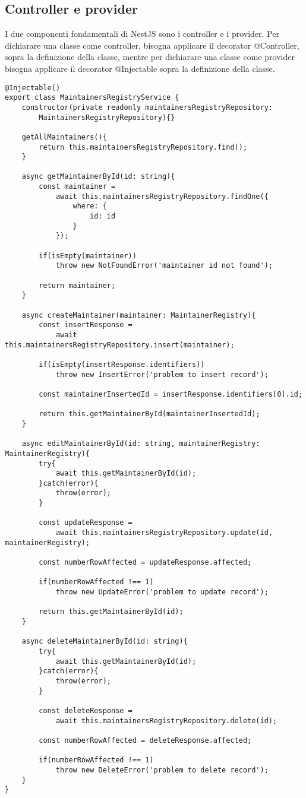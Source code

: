 \subsection{Controller e provider}
I due componenti fondamentali di NestJS sono i controller e i provider. 
Per dichiarare una classe come controller, bisogna applicare il decorator @Controller, sopra la 
definizione della classe, mentre per dichiarare una classe come provider bisogna applicare il decorator
@Injectable sopra la definizione della classe.
\\
\begin{lstlisting}
@Injectable()
export class MaintainersRegistryService {
    constructor(private readonly maintainersRegistryRepository: 
        MaintainersRegistryRepository){}

    getAllMaintainers(){
        return this.maintainersRegistryRepository.find();
    }

    async getMaintainerById(id: string){
        const maintainer = 
            await this.maintainersRegistryRepository.findOne({
                where: {
                    id: id
                }
            });

        if(isEmpty(maintainer))
            throw new NotFoundError('maintainer id not found');

        return maintainer;
    }

    async createMaintainer(maintainer: MaintainerRegistry){
        const insertResponse = 
            await this.maintainersRegistryRepository.insert(maintainer);

        if(isEmpty(insertResponse.identifiers))
            throw new InsertError('problem to insert record');

        const maintainerInsertedId = insertResponse.identifiers[0].id;

        return this.getMaintainerById(maintainerInsertedId);
    }

    async editMaintainerById(id: string, maintainerRegistry: MaintainerRegistry){
        try{
            await this.getMaintainerById(id);    
        }catch(error){
            throw(error);
        }
        
        const updateResponse = 
            await this.maintainersRegistryRepository.update(id, maintainerRegistry);

        const numberRowAffected = updateResponse.affected;

        if(numberRowAffected !== 1)
            throw new UpdateError('problem to update record');

        return this.getMaintainerById(id);
    }

    async deleteMaintainerById(id: string){
        try{
            await this.getMaintainerById(id);    
        }catch(error){
            throw(error);
        }

        const deleteResponse = 
            await this.maintainersRegistryRepository.delete(id);

        const numberRowAffected = deleteResponse.affected;

        if(numberRowAffected !== 1)
            throw new DeleteError('problem to delete record');
    }
}
\end{lstlisting}
